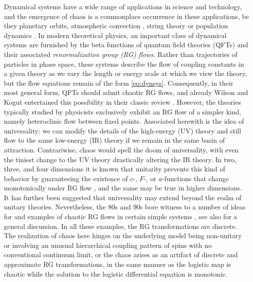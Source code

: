 Dynamical systems have a wide range of applications in science and technology, and the emergence of chaos is a commonplace occurrence in these applications, be they planetary orbits, atmospheric convection \cite{lorenz1963deterministic}, string theory \cite{maldacena2016remarks,Gross:2021gsj,PhysRevLett.127.021601} or population dynamics \cite{Arnold_1983}. In modern theoretical physics, an important class of dynamical systems are furnished by the beta functions of quantum field theories (QFTs) and their associated \textit{renormalization group (RG) flows}. Rather than trajectories of particles in phase space, these systems describe the flow of coupling constants in a given theory as we vary the length or energy scale at which we view the theory, but the flow equations remain of the form \cref{eq:dynsys}.  Consequently, in their most general form, QFTs should admit chaotic RG flows, and already Wilson and Kogut entertained this possibility in their classic review \cite{Wilson:1973jj}. However, the theories typically studied by physicists exclusively exhibit an RG flow of a simpler kind, namely heteroclinic flow between fixed points.  Associated herewith is the idea of universality: we can modify the details of the high-energy (UV) theory and still flow to the same low-energy (IR) theory if we remain in the same basin of attraction. Contrariwise, chaos would spell the doom of universality, with even the tiniest change to the UV theory drastically altering the IR theory. In two, three, and four dimensions it is known that unitarity prevents this kind of behavior by guaranteeing the existence of $c$-, $F$-, or $a$-functions that change monotonically under RG flow \cite{zamolodchikov1986irreversibility,Klebanov:2011gs,Jafferis:2011zi,Casini:2012ei,Komargodski:2011vj,Luty:2012ww}, and the same may be true in higher dimensions. It has further been suggested \cite{Binder:2019zqc} that universality may extend beyond the realm of unitary theories. Nevertheless, the 80s and 90s bore witness to a number of ideas for and examples of chaotic RG flows in certain simple systems \cite{mckay1982spin,berker1984hierarchical,svrakic1982hierarchical,Damgaard:1991zh, Damgaard:1991zb, Dolan:1994wt}, see also \cite{Damgaard:1991zb} for a general discussion. In all these examples, the RG transformations are discrete. The realization of chaos here hinges on the underlying model being non-unitary or involving an unusual hierarchical coupling pattern of spins with no conventional continuum limit, or the chaos arises as an artifact of discrete and approximate RG transformations, in the same manner as the logistic map is chaotic while the solution to the logistic differential equation is monotonic. 

